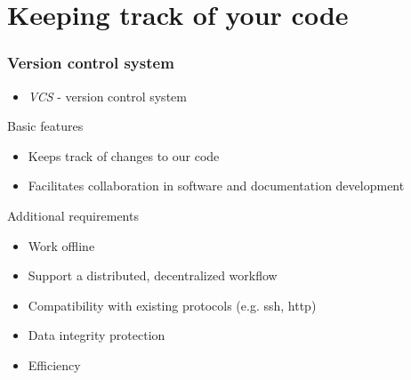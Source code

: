 \section{Keeping track of your code}

\begin{frame}

\frametitle{Version control system}
	
	\begin{itemize}
	\item \emph{VCS} - version control system
	\end{itemize}
	
\begin{block}{Basic features}
	\begin{itemize}
		\item Keeps track of changes to our code
		\item Facilitates collaboration in software and documentation development
	\end{itemize}
\end{block}
	
\begin{block}{Additional requirements}
	\begin{itemize}
		\item Work offline
		\item Support a distributed, decentralized workflow
		\item Compatibility with existing protocols (e.g. ssh, http)
		\item Data integrity protection
		\item Efficiency
	\end{itemize}
\end{block}

\end{frame}


